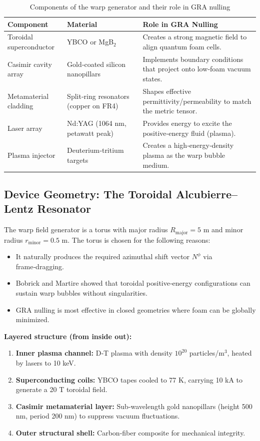 \documentclass[11pt]{article}
\begin{document}
\begin{table}[h]
\centering
\caption{Components of the warp generator and their role in GRA nulling}
\label{tab:components}
\begin{tabular}{@{}lll@{}}
\toprule
\textbf{Component} & \textbf{Material} & \textbf{Role in GRA Nulling} \\
\midrule
Toroidal superconductor & YBCO or MgB$_2$ & Creates a strong magnetic field to align quantum foam cells. \\
Casimir cavity array & Gold‑coated silicon nanopillars & Implements boundary conditions that project onto low‑foam vacuum states. \\
Metamaterial cladding & Split‑ring resonators (copper on FR4) & Shapes effective permittivity/permeability to match the metric tensor. \\
Laser array & Nd:YAG (1064 nm, petawatt peak) & Provides energy to excite the positive‑energy fluid (plasma). \\
Plasma injector & Deuterium‑tritium targets & Creates a high‑energy‑density plasma as the warp bubble medium. \\
\bottomrule
\end{tabular}
\end{table}

\subsection{Device Geometry: The Toroidal Alcubierre--Lentz Resonator}

The warp field generator is a torus with major radius $R_{\text{major}} = 5$ m and minor radius $r_{\text{minor}} = 0.5$ m. The torus is chosen for the following reasons:
\begin{itemize}
    \item It naturally produces the required azimuthal shift vector $N^\phi$ via frame‑dragging.
    \item Bobrick and Martire showed that toroidal positive‑energy configurations can sustain warp bubbles without singularities.
    \item GRA nulling is most effective in closed geometries where foam can be globally minimized.
\end{itemize}

\textbf{Layered structure (from inside out):}
\begin{enumerate}
    \item \textbf{Inner plasma channel:} D‑T plasma with density $10^{20}$ particles/m$^3$, heated by lasers to 10 keV.
    \item \textbf{Superconducting coils:} YBCO tapes cooled to 77 K, carrying 10 kA to generate a 20 T toroidal field.
    \item \textbf{Casimir metamaterial layer:} Sub‑wavelength gold nanopillars (height 500 nm, period 200 nm) to suppress vacuum fluctuations.
    \item \textbf{Outer structural shell:} Carbon‑fiber composite for mechanical integrity.
\end{enumerate}
\end{document}

